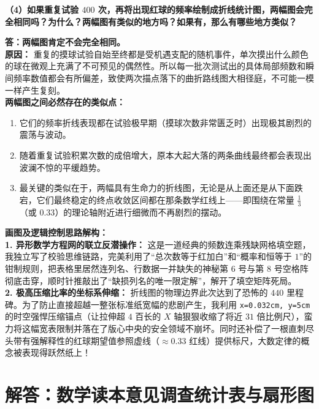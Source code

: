 \documentclass[12pt, a4paper]{ctexrep}
\begin{document}
\textbf{（4）如果重复试验 $400$ 次，再将出现红球的频率绘制成折线统计图，两幅图会完全相同吗？为什么？两幅图有类似的地方吗？如果有，那么有哪些地方类似？}

\vspace{0.2cm}
\textbf{答：两幅图肯定不会完全相同。}\\
\textbf{原因：} 重复的摸球试验自始至终都是受机遇支配的随机事件，单次摸出什么颜色的球在微观上充满了不可预见的偶然性。所以每一批次测试出的具体局部频数和瞬间频率数值都会有所偏差，致使两次描点落下的曲折路线图大相径庭，不可能一模一样产生复刻。\\
\textbf{两幅图之间必然存在的类似点：} 
\begin{enumerate}
    \item 它们的频率折线表现都在试验极早期（摸球次数非常匮乏时）出现极其剧烈的震荡与波动。
    \item 随着重复试验积累次数的成倍增大，原本大起大落的两条曲线最终都会表现出波澜不惊的平缓趋势。
    \item 最关键的类似在于，两幅具有生命力的折线图，无论是从上面还是从下面跌宕，它们最终稳定的终点收敛区间都在那条数学红线上——即围绕在常量 $\frac{1}{3}$（或 $0.33$）的理论轴附近进行细微而不再剧烈的摆动。
\end{enumerate}

\vspace{0.6cm}

{\small\color{blue!70!black}
\textbf{画图及逻辑控制思路解构：}\\
\textbf{1. 异形数学方程网的联立反潜操作：} 这是一道经典的频数连乘残缺网格填空题，我独立写了校验思维链路，完美利用了“总次数等于红加白”和“概率和恒等于 $1$”的钳制规则，把表格里居然连列名、行数据一并缺失的神秘第 $6$ 号与第 $8$ 号空格阵彻底击穿，顺时针推敲出了“缺损列名的唯一限定解”，解开了填空矩阵死局。\\
\textbf{2. 极高压缩比率的坐标系伸缩：} 折线图的物理边界此次达到了恐怖的 $440$ 里程碑。为了防止直接超越一整张标准纸宽幅的悲剧产生，我利用 \texttt{x=0.032cm, y=5cm} 的时空强悍压缩锚点（让拉伸超 $4$ 百长的 $X$ 轴狠狠收缩了将近 $31$ 倍比例尺），蛮力将这幅宽表限制并落在了版心中央的安全领域不崩坏。同时还补偿了一根直刺尽头带有强解释性的红球期望值参照虚线（$\approx 0.33$ 红线）提供标尺，大数定律的概念被表现得跃然纸上！
}


\newpage

\section{解答：数学读本意见调查统计表与扇形图}
\end{document}
